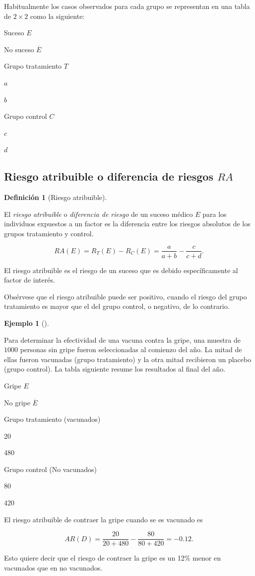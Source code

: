 \documentclass[
  spanish,
  a4paper,
]{scrreport}
\theoremstyle{plain}
\theoremstyle{definition}
\newtheorem{example}{Ejemplo}[chapter]
\theoremstyle{definition}
\newtheorem{definition}{Definición}[chapter]
\theoremstyle{remark}
\begin{document}
Habitualmente los casos observados para cada grupo se representan en una
tabla de \(2\times2\) como la siguiente:

Suceso \(E\)

No suceso \(\overline E\)

Grupo tratamiento \(T\)

\(a\)

\(b\)

Grupo control \(C\)

\(c\)

\(d\)

\subsection{\texorpdfstring{Riesgo atribuible o diferencia de riesgos
\(RA\)}{Riesgo atribuible o diferencia de riesgos RA}}\label{riesgo-atribuible-o-diferencia-de-riesgos-ra}

\begin{definition}[Riesgo
atribuible]\protect\hypertarget{def-riesgo-atribuible}{}\label{def-riesgo-atribuible}

El \emph{riesgo atribuible} o \emph{diferencia de riesgo} de un suceso
médico \(E\) para los individuos expuestos a un factor es la diferencia
entre los riesgos absolutos de los grupos tratamiento y control.

\[RA(E)=R_T(E)-R_C(E)=\frac{a}{a+b}-\frac{c}{c+d}.\]

\end{definition}

El riesgo atribuible es el riesgo de un suceso que es debido
específicamente al factor de interés.

Obsérvese que el riesgo atribuible puede ser positivo, cuando el riesgo
del grupo tratamiento es mayor que el del grupo control, o negativo, de
lo contrario.

\begin{example}[]\protect\hypertarget{exm-riesgo-atribuible}{}\label{exm-riesgo-atribuible}

Para determinar la efectividad de una vacuna contra la gripe, una
muestra de \(1000\) personas sin gripe fueron seleccionadas al comienzo
del año. La mitad de ellas fueron vacunadas (grupo tratamiento) y la
otra mitad recibieron un placebo (grupo control). La tabla siguiente
resume los resultados al final del año.

Gripe \(E\)

No gripe \(\overline E\)

Grupo tratamiento (vacunados)

20

480

Grupo control (No vacunados)

80

420

El riesgo atribuible de contraer la gripe cuando se es vacunado es

\[AR(D) = \frac{20}{20+480}-\frac{80}{80+420} = -0.12.\]

Esto quiere decir que el riesgo de contraer la gripe es un 12\% menor en
vacunados que en no vacunados.

\end{example}
\end{document}
